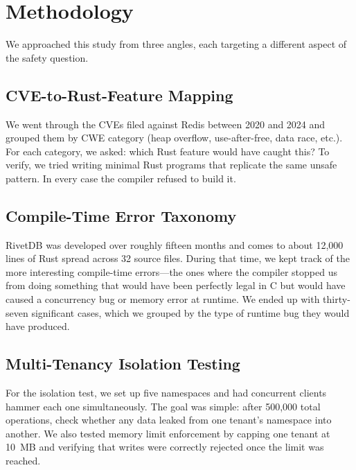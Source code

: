 \documentclass[conference,a4paper]{IEEEtran}
\begin{document}
\section{Methodology}

We approached this study from three angles, each targeting a different aspect of the safety question.

\subsection{CVE-to-Rust-Feature Mapping}

We went through the CVEs filed against Redis between 2020 and 2024 and grouped them by CWE category (heap overflow, use-after-free, data race, etc.). For each category, we asked: which Rust feature would have caught this? To verify, we tried writing minimal Rust programs that replicate the same unsafe pattern. In every case the compiler refused to build it.

\subsection{Compile-Time Error Taxonomy}

RivetDB was developed over roughly fifteen months and comes to about 12,000 lines of Rust spread across 32 source files. During that time, we kept track of the more interesting compile-time errors---the ones where the compiler stopped us from doing something that would have been perfectly legal in C but would have caused a concurrency bug or memory error at runtime. We ended up with thirty-seven significant cases, which we grouped by the type of runtime bug they would have produced.

\subsection{Multi-Tenancy Isolation Testing}

For the isolation test, we set up five namespaces and had concurrent clients hammer each one simultaneously. The goal was simple: after 500,000 total operations, check whether any data leaked from one tenant's namespace into another. We also tested memory limit enforcement by capping one tenant at 10~MB and verifying that writes were correctly rejected once the limit was reached.

\end{document}
